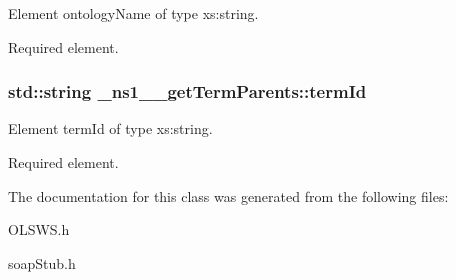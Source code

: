 Element ontologyName of type xs:string. 

Required element. \hypertarget{class__ns1____getTermParents_aa94fee4393ebbdb785e2bfca3eca1cb7}{
\subsubsection[{termId}]{\setlength{\rightskip}{0pt plus 5cm}std::string {\bf \_\-ns1\_\-\_\-getTermParents::termId}}}
\label{class__ns1____getTermParents_aa94fee4393ebbdb785e2bfca3eca1cb7}


Element termId of type xs:string. 

Required element. 

The documentation for this class was generated from the following files:\begin{DoxyCompactItemize}
\item 
OLSWS.h\item 
soapStub.h\end{DoxyCompactItemize}

